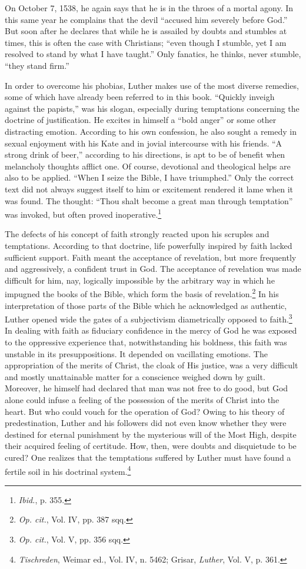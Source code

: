 On October 7, 1538, he again says that he is in the throes of a
mortal agony. In this same year he complains that the devil “accused
him severely before God.” But soon after he declares that while he is
assailed by doubts and stumbles at times, this is often the case with
Christians; “even though I stumble, yet I am resolved to stand by
what I have taught.” Only fanatics, he thinks, never stumble, “they
stand firm.”

In order to overcome his phobias, Luther makes use of the most
diverse remedies, some of which have already been referred to in
this book. “Quickly inveigh against the papists,” was his slogan,
especially during temptations concerning the doctrine of justification.
He excites in himself a “bold anger” or some other distracting
emotion. According to his own confession, he also sought a remedy in
sexual enjoyment with his Kate and in jovial intercourse with his
friends. “A strong drink of beer,” according to his directions, is apt
to be of benefit when melancholy thoughts afflict one. Of course,
devotional and theological helps are also to be applied. “When I seize
the Bible, I have triumphed.” Only the correct text did not always
suggest itself to him or excitement rendered it lame when it was
found. The thought: “Thou shalt become a great man through temptation”
was invoked, but often proved inoperative.\footnote{\textit{Ibid.}, p. 355.}

The defects of his concept of faith strongly reacted upon his scruples and
temptations. According to that doctrine, life powerfully inspired by faith
lacked sufficient support. Faith meant the acceptance of revelation, but more
frequently and aggressively, a confident trust in God. The acceptance of
revelation was made difficult for him, nay, logically impossible by the
arbitrary way in which he impugned the books of the Bible, which form the basis
of revelation.\footnote {\textit{Op. cit.}, Vol. IV, pp. 387 sqq.} In his
interpretation of those parts of the Bible which he acknowledged as authentic,
Luther opened wide the gates of a subjectivism diametrically opposed to
faith.\footnote{\textit{Op. cit.}, Vol. V, pp. 356 sqq.} In dealing with faith
as fiduciary confidence in the mercy of God he was exposed to the oppressive
experience that, notwithstanding his boldness, this faith was unstable in its
presuppositions. It depended on vacillating emotions. The appropriation of the
merits of Christ, the cloak of His justice, was a very difficult and mostly
unattainable matter for a conscience weighed down by guilt. Moreover, he
himself had declared that man was not free to do good, but God alone could
infuse a feeling of the possession of the merits of Christ into the heart. But
who could vouch for the operation of God? Owing to his theory of
predestination, Luther and his followers did not even know whether they were
destined for eternal punishment by the mysterious will of the Most High,
despite their acquired feeling of certitude. How, then, were doubts and
disquietude to be cured? One realizes that the temptations suffered by Luther
must have found a fertile soil in his doctrinal
system.\footnote{\textit{Tischreden}, Weimar ed., Vol. IV, n. 5462; Grisar,
\textit{Luther}, Vol. V, p. 361.}

